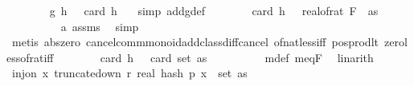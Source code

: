 \begin{isabellebody}
\ \ \ \ \ \ \isamarkupfalse%
\ {\isachardoublequoteopen}g{\isacharprime}{\kern0pt}\ {\isacharparenleft}{\kern0pt}h\ {\isasymomega}{\isacharparenright}{\kern0pt}\ {\isacharequal}{\kern0pt}\ card\ {\isacharparenleft}{\kern0pt}h\ {\isasymomega}{\isacharparenright}{\kern0pt}{\isachardoublequoteclose}\ \isamarkupfalse%
\ {\isacharparenleft}{\kern0pt}simp\ add{\isacharcolon}{\kern0pt}g{\isacharprime}{\kern0pt}{\isacharunderscore}{\kern0pt}def{\isacharparenright}{\kern0pt}\isanewline
\ \ \ \ \ \ \isamarkupfalse%
\ {\isachardoublequoteopen}card\ {\isacharparenleft}{\kern0pt}h\ {\isasymomega}{\isacharparenright}{\kern0pt}\ {\isasymnoteq}\ real{\isacharunderscore}{\kern0pt}of{\isacharunderscore}{\kern0pt}rat\ {\isacharparenleft}{\kern0pt}F\ {}\ as{\isacharparenright}{\kern0pt}{\isachardoublequoteclose}\isanewline
\ \ \ \ \ \ \ \ \isamarkupfalse%
\ a\ assms{\isacharparenleft}{\kern0pt}{}{\isacharparenright}{\kern0pt}\ \isamarkupfalse%
\ simp\ \isanewline
\ \ \ \ \ \ \ \ \isamarkupfalse%
\ {\isacharparenleft}{\kern0pt}metis\ abs{\isacharunderscore}{\kern0pt}zero\ cancel{\isacharunderscore}{\kern0pt}comm{\isacharunderscore}{\kern0pt}monoid{\isacharunderscore}{\kern0pt}add{\isacharunderscore}{\kern0pt}class{\isachardot}{\kern0pt}diff{\isacharunderscore}{\kern0pt}cancel\ of{\isacharunderscore}{\kern0pt}nat{\isacharunderscore}{\kern0pt}less{\isacharunderscore}{\kern0pt}{}{\isacharunderscore}{\kern0pt}iff\ pos{\isacharunderscore}{\kern0pt}prod{\isacharunderscore}{\kern0pt}lt\ zero{\isacharunderscore}{\kern0pt}less{\isacharunderscore}{\kern0pt}of{\isacharunderscore}{\kern0pt}rat{\isacharunderscore}{\kern0pt}iff{\isacharparenright}{\kern0pt}\isanewline
\ \ \ \ \ \ \isamarkupfalse%
\ {\isachardoublequoteopen}card\ {\isacharparenleft}{\kern0pt}h\ {\isasymomega}{\isacharparenright}{\kern0pt}\ {\isasymnoteq}\ card\ {\isacharparenleft}{\kern0pt}set\ as{\isacharparenright}{\kern0pt}{\isachardoublequoteclose}\isanewline
\ \ \ \ \ \ \ \ \isamarkupfalse%
\ m{\isacharunderscore}{\kern0pt}def\ m{\isacharunderscore}{\kern0pt}eq{\isacharunderscore}{\kern0pt}F{\isacharunderscore}{\kern0pt}{}\ \isamarkupfalse%
\ linarith\isanewline
\ \ \ \ \ \ \isamarkupfalse%
\ {\isachardoublequoteopen}{\isasymnot}inj{\isacharunderscore}{\kern0pt}on\ {\isacharparenleft}{\kern0pt}{\isasymlambda}x{\isachardot}{\kern0pt}\ truncate{\isacharunderscore}{\kern0pt}down\ r\ {\isacharparenleft}{\kern0pt}real\ {\isacharparenleft}{\kern0pt}hash\ p\ x\ {\isasymomega}{\isacharparenright}{\kern0pt}{\isacharparenright}{\kern0pt}{\isacharparenright}{\kern0pt}\ {\isacharparenleft}{\kern0pt}set\ as{\isacharparenright}{\kern0pt}{\isachardoublequoteclose}\isanewline

\end{isabellebody}
